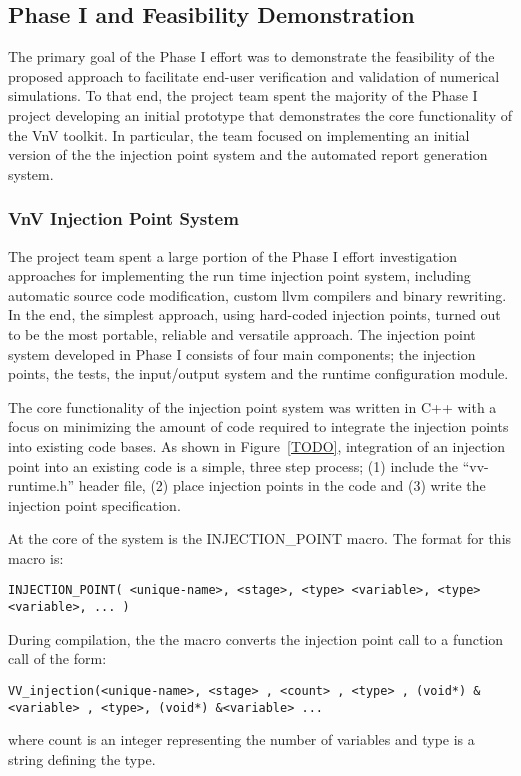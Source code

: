 \subsection{Phase I and Feasibility Demonstration}

The primary goal of the Phase I effort was to demonstrate the feasibility of the proposed approach to facilitate end-user 
verification and validation of numerical simulations. To that end, the project team spent the majority of the Phase I
project developing an initial prototype that demonstrates the core functionality of the VnV toolkit. In particular, the team focused on implementing an initial version of the the injection point system and the automated report generation system. 
\subsubsection{VnV Injection Point System}

The project team spent a large portion of the Phase I effort investigation approaches for implementing the run time injection point system, including 
automatic source code modification, custom llvm compilers and binary rewriting. In the end, the simplest approach,
using hard-coded injection points, turned out to be the most portable, reliable and versatile approach. The injection point system developed in Phase I consists of four main components; the injection points, the tests, the input/output system and the runtime configuration module. 

The core functionality of the injection point system was written in C++ with a focus on minimizing the amount of 
code required to integrate the injection points into existing code bases. As shown in Figure~\ref{TODO}, integration of an injection point into an existing code is a simple, three step process; (1) include the ``vv-runtime.h'' header file, (2) place injection points in the code and (3) write the injection point specification. 

At the core of the system is the INJECTION\_POINT macro. The format for this macro is:

\begin{verbatim} 
INJECTION_POINT( <unique-name>, <stage>, <type> <variable>, <type> <variable>, ... )
\end{verbatim}

During compilation, the the macro converts the injection point call to a function call of the form:

\begin{verbatim}
VV_injection(<unique-name>, <stage> , <count> , <type> , (void*) &<variable> , <type>, (void*) &<variable> ...
\end{verbatim}
where count is an integer representing the number of variables and type is a string defining the type. 

